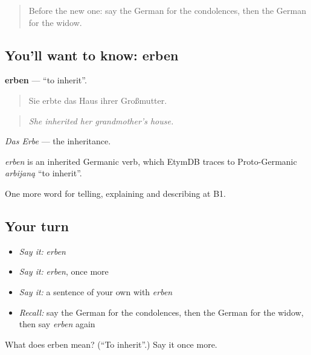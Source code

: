 \label{lesson:GE-C304-erben}



\begin{quote}
Before the new one: say the German for the condolences, then the German for the widow.
\end{quote}

\subsection*{You'll want to know: erben}
\textbf{erben} — \textquotedblleft{}to inherit\textquotedblright{}.

\begin{quote}
Sie erbte das Haus ihrer Großmutter.
\end{quote}

\begin{quote}
\emph{She inherited her grandmother's house.}
\end{quote}

\emph{Das Erbe} — the inheritance.

\begin{cousinweb}
\emph{erben} is an inherited Germanic verb, which EtymDB traces to Proto-Germanic \emph{arbijaną} \textquotedblleft{}to inherit\textquotedblright{}.
\end{cousinweb}

\begin{grammarlens}[title={What you've built}]
One more word for telling, explaining and describing at B1.
\end{grammarlens}

\subsection*{Your turn}
\begin{itemize}
\raggedright
  \item \emph{Say it:} \emph{erben}
  \item \emph{Say it:} \emph{erben}, once more
  \item \emph{Say it:} a sentence of your own with \emph{erben}
  \item \emph{Recall:} say the German for the condolences, then the German for the widow, then say \emph{erben} again
\end{itemize}

\begin{tcolorbox}[breakable,colback=teal!4,colframe=teal!35!black,title={Before you move on}]
What does erben mean? (\textquotedblleft{}To inherit\textquotedblright{}.) Say it once more.
\end{tcolorbox}
